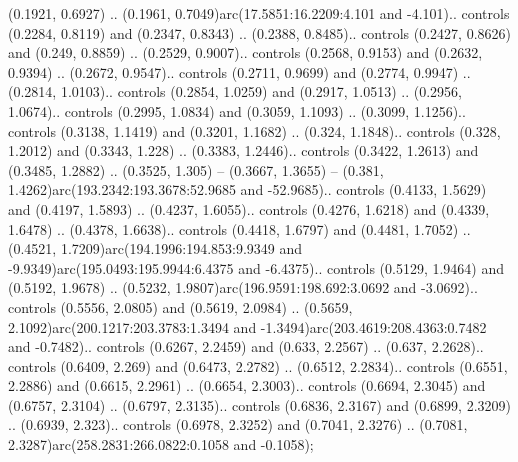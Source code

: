 (0.1921, 0.6927) .. (0.1961, 0.7049)arc(17.5851:16.2209:4.101 and -4.101).. controls (0.2284, 0.8119) and (0.2347, 0.8343) .. (0.2388, 0.8485).. controls (0.2427, 0.8626) and (0.249, 0.8859) .. (0.2529, 0.9007).. controls (0.2568, 0.9153) and (0.2632, 0.9394) .. (0.2672, 0.9547).. controls (0.2711, 0.9699) and (0.2774, 0.9947) .. (0.2814, 1.0103).. controls (0.2854, 1.0259) and (0.2917, 1.0513) .. (0.2956, 1.0674).. controls (0.2995, 1.0834) and (0.3059, 1.1093) .. (0.3099, 1.1256).. controls (0.3138, 1.1419) and (0.3201, 1.1682) .. (0.324, 1.1848).. controls (0.328, 1.2012) and (0.3343, 1.228) .. (0.3383, 1.2446).. controls (0.3422, 1.2613) and (0.3485, 1.2882) .. (0.3525, 1.305) -- (0.3667, 1.3655) -- (0.381, 1.4262)arc(193.2342:193.3678:52.9685 and -52.9685).. controls (0.4133, 1.5629) and (0.4197, 1.5893) .. (0.4237, 1.6055).. controls (0.4276, 1.6218) and (0.4339, 1.6478) .. (0.4378, 1.6638).. controls (0.4418, 1.6797) and (0.4481, 1.7052) .. (0.4521, 1.7209)arc(194.1996:194.853:9.9349 and -9.9349)arc(195.0493:195.9944:6.4375 and -6.4375).. controls (0.5129, 1.9464) and (0.5192, 1.9678) .. (0.5232, 1.9807)arc(196.9591:198.692:3.0692 and -3.0692).. controls (0.5556, 2.0805) and (0.5619, 2.0984) .. (0.5659, 2.1092)arc(200.1217:203.3783:1.3494 and -1.3494)arc(203.4619:208.4363:0.7482 and -0.7482).. controls (0.6267, 2.2459) and (0.633, 2.2567) .. (0.637, 2.2628).. controls (0.6409, 2.269) and (0.6473, 2.2782) .. (0.6512, 2.2834).. controls (0.6551, 2.2886) and (0.6615, 2.2961) .. (0.6654, 2.3003).. controls (0.6694, 2.3045) and (0.6757, 2.3104) .. (0.6797, 2.3135).. controls (0.6836, 2.3167) and (0.6899, 2.3209) .. (0.6939, 2.323).. controls (0.6978, 2.3252) and (0.7041, 2.3276) .. (0.7081, 2.3287)arc(258.2831:266.0822:0.1058 and -0.1058);



